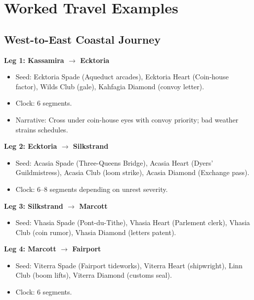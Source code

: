 \section{Worked Travel Examples}
\label{sec:worked-examples}

\subsection{West-to-East Coastal Journey}
\label{subsec:coastal-journey}

\textbf{Leg 1: Kassamira $\rightarrow$ Ecktoria}
\begin{itemize}
\item Seed: Ecktoria Spade (Aqueduct arcades), Ecktoria Heart (Coin-house factor), Wilds Club (gale), Kahfagia Diamond (convoy letter).
\item Clock: 6 segments.
\item Narrative: Cross under coin-house eyes with convoy priority; bad weather strains schedules.
\end{itemize}

\textbf{Leg 2: Ecktoria $\rightarrow$ Silkstrand}
\begin{itemize}
\item Seed: Acasia Spade (Three-Queens Bridge), Acasia Heart (Dyers' Guildmistress), Acasia Club (loom strike), Acasia Diamond (Exchange pass).
\item Clock: 6–8 segments depending on unrest severity.
\end{itemize}

\textbf{Leg 3: Silkstrand $\rightarrow$ Marcott}
\begin{itemize}
\item Seed: Vhasia Spade (Pont-du-Tithe), Vhasia Heart (Parlement clerk), Vhasia Club (coin rumor), Vhasia Diamond (letters patent).
\end{itemize}

\textbf{Leg 4: Marcott $\rightarrow$ Fairport}
\begin{itemize}
\item Seed: Viterra Spade (Fairport tideworks), Viterra Heart (shipwright), Linn Club (boom lifts), Viterra Diamond (customs seal).
\item Clock: 6 segments.
\end{itemize}


